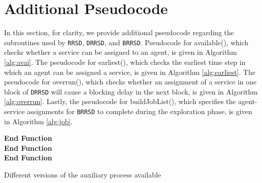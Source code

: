 \documentclass[letterpaper,11pt]{article}
\begin{document}
\section{Additional Pseudocode}
In this section, for clarity, we provide additional pseudocode regarding the subroutines used by \texttt{RRSD}, \texttt{DRRSD}, and \texttt{BRRSD}. Pseudocode for available(), which checks whether a service can be assigned to an agent, is given in Algorithm \ref{alg:avai}. The pseudocode for earliest(), which checks the earliest time step in which an agent can be assigned a service, is given in Algorithm \ref{alg:earliest}. The pseudocode for overrun(), which checks whether an assignment of a service in one block of \texttt{DRRSD} will cause a blocking delay in the next block, is given in Algorithm \ref{alg:overrun}. Lastly, the pseudocode for buildJobList(), which specifies the agent-service assignments for \texttt{BRRSD} to complete during the exploration phase, is given in Algorithm \ref{alg:job}.
\begin{algorithm}[t!] 
\SetAlgoLined
\textbf{End Function} \\
\textbf{End Function} \\
\textbf{End Function}
 \caption{Different versions of the auxiliary process available\label{alg:avai}}
\end{algorithm}
\end{document}
